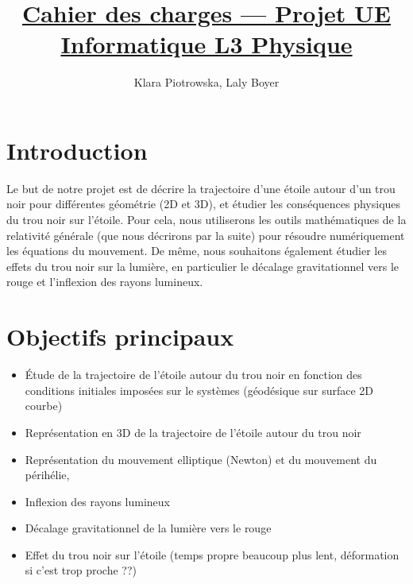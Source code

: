 \documentclass{article}
\title{\underline{Cahier des charges — Projet UE Informatique L3 Physique}\vspace{2em}
\tcbox[colframe=black,colback=white,boxrule=0.5mm]{\begin{minipage}{1\textwidth} %
\centering \textbf{\Large Relativité Générale - Étude du mouvement d'une étoile autour d'un trou noir de Schwarzschild}
\end{minipage}}}
\author{Klara Piotrowska, Laly Boyer}
\begin{document}
\maketitle
\tableofcontents

\newpage

\section{Introduction}


Le but de notre projet est de décrire la trajectoire d’une étoile autour d’un trou noir pour différentes géométrie (2D et 3D), et étudier les conséquences physiques du trou noir sur l'étoile. Pour cela, nous utiliserons les outils mathématiques de la relativité générale (que nous décrirons par la suite) pour résoudre numériquement les équations du mouvement. 
De même, nous souhaitons également étudier les effets du trou noir sur la lumière, en particulier le décalage gravitationnel vers le rouge et l’inflexion des rayons lumineux.


\section{Objectifs principaux} 
\begin{itemize}[label=\textendash]
    \item Étude de la trajectoire de l’étoile autour du trou noir en fonction des conditions initiales imposées sur le systèmes (géodésique sur surface 2D courbe)
    \item Représentation en 3D de la trajectoire de l’étoile autour du trou noir
    \item Représentation du mouvement elliptique (Newton) et du mouvement du périhélie, 
    \item Inflexion des rayons lumineux
    \item Décalage gravitationnel de la lumière vers le rouge 
    \item Effet du trou noir sur l’étoile (temps propre beaucoup plus lent, déformation si c’est trop proche ??)
\end{itemize}
\end{document}
